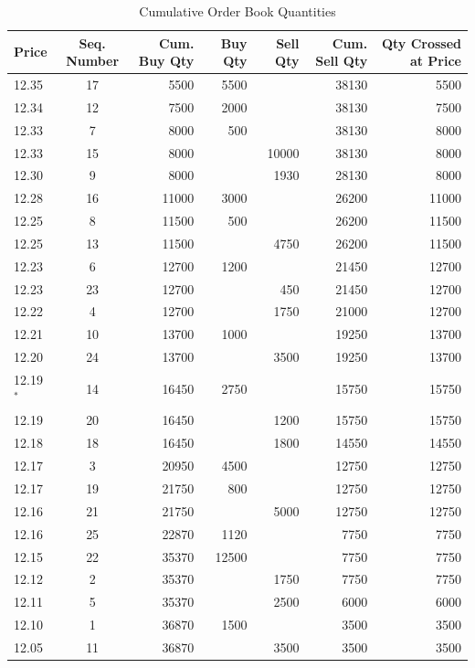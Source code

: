 \begin{table}[!ht]
   \centering
   \caption{Cumulative Order Book Quantities \label{tab:openAuct3}}
   \begin{tabular}{lcrrrrr} 
	Price & Seq. Number & Cum. Buy Qty & Buy Qty & Sell Qty & Cum. Sell Qty & Qty Crossed at Price \\ \hline
	12.35 &  17 & 5500  & 5500 &  & 38130 & 5500 \\
	12.34 & 12 & 7500 & 2000 & & 38130 & 7500  \\	
	12.33 & 7  &  8000 & 500 &  & 38130 & 8000 \\	
	12.33 &  15 & 8000 &  & 10000 & 38130 & 8000 \\	
	12.30 & 9 & 8000 & & 1930 & 28130 & 8000 \\					
	12.28 &  16 & 11000  & 3000 &  & 26200 & 11000 \\	
	12.25 & 8 &  11500 & 500 & & 26200 & 11500 \\	
	12.25 & 13 & 11500 & & 4750 & 26200 & 11500 \\	
	12.23 & 6 &  12700 & 1200 & & 21450 & 12700 \\		
	12.23 &  23 & 12700 & & 450 & 21450 & 12700 \\
	12.22 & 4  & 12700 & & 1750 & 21000 & 12700 \\	
	12.21  & 10 & 13700  & 1000 & & 19250 & 13700 \\		
	12.20 &  24 & 13700 & & 3500 & 19250 & 13700 \\	
	12.19$^*$ &  14 & 16450  & 2750 &  & 15750 & 15750 \\		
	12.19 &  20 & 16450 & & 1200 & 15750 & 15750 \\
	12.18 &  18 & 16450 & & 1800 & 14550 & 14550 \\
	12.17 & 3  &  20950 & 4500  & & 12750 & 12750 \\		
	12.17 &  19 & 21750 & 800 & & 12750 & 12750 \\			
	12.16 &  21 & 21750 & & 5000 & 12750 & 12750 \\
	12.16 &  25 & 22870 & 1120 & & 7750 & 7750 \\		
	12.15  &  22 & 35370 & 12500 & & 7750 & 7750 \\
	12.12  & 2  & 35370 & & 1750 & 7750 & 7750 \\		
	12.11  & 5  & 35370 & & 2500 & 6000 & 6000 \\				
	12.10 & 1  &  36870 & 1500 & & 3500 & 3500 \\
	12.05  & 11 & 36870 & & 3500 & 3500 & 3500 	
   \end{tabular}
\end{table}


